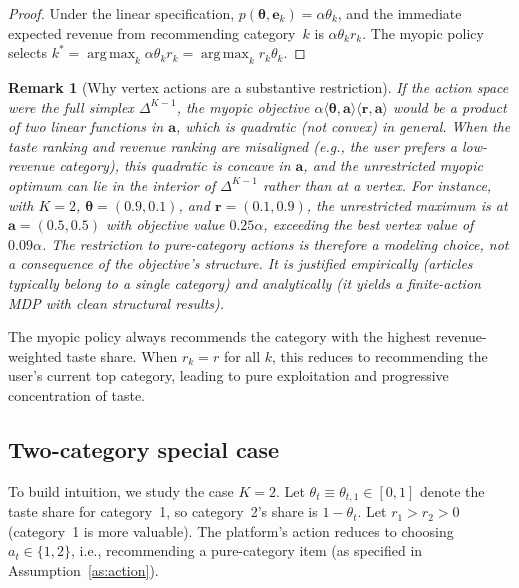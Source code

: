 \documentclass[11pt]{article}
\newtheorem{remark}{Remark}
\DeclareMathOperator*{\argmax}{arg\,max}
\begin{document}
\begin{proof}
Under the linear specification, $p(\boldsymbol{\theta}, \mathbf{e}_k) = \alpha \theta_k$, and the immediate expected revenue from recommending category~$k$ is $\alpha \theta_k r_k$. The myopic policy selects $k^* = \argmax_k \alpha \theta_k r_k = \argmax_k r_k \theta_k$.
\end{proof}

\begin{remark}[Why vertex actions are a substantive restriction]\label{rem:vertex}
If the action space were the full simplex $\Delta^{K-1}$, the myopic objective $\alpha \langle \boldsymbol{\theta}, \mathbf{a}\rangle \langle \mathbf{r}, \mathbf{a}\rangle$ would be a product of two linear functions in $\mathbf{a}$, which is quadratic (not convex) in general. When the taste ranking and revenue ranking are misaligned (e.g., the user prefers a low-revenue category), this quadratic is concave in $\mathbf{a}$, and the unrestricted myopic optimum can lie in the interior of $\Delta^{K-1}$ rather than at a vertex. For instance, with $K=2$, $\boldsymbol{\theta} = (0.9, 0.1)$, and $\mathbf{r} = (0.1, 0.9)$, the unrestricted maximum is at $\mathbf{a} = (0.5, 0.5)$ with objective value $0.25\alpha$, exceeding the best vertex value of $0.09\alpha$. The restriction to pure-category actions is therefore a modeling choice, not a consequence of the objective's structure. It is justified empirically (articles typically belong to a single category) and analytically (it yields a finite-action MDP with clean structural results).
\end{remark}

The myopic policy always recommends the category with the highest revenue-weighted taste share. When $r_k = r$ for all $k$, this reduces to recommending the user's current top category, leading to pure exploitation and progressive concentration of taste.

\subsection{Two-category special case}
\label{sec:two_cat}

To build intuition, we study the case $K = 2$. Let $\theta_t \equiv \theta_{t,1} \in [0,1]$ denote the taste share for category~1, so category~2's share is $1 - \theta_t$. Let $r_1 > r_2 > 0$ (category~1 is more valuable). The platform's action reduces to choosing $a_t \in \{1, 2\}$, i.e., recommending a pure-category item (as specified in Assumption~\ref{as:action}).
\end{document}
